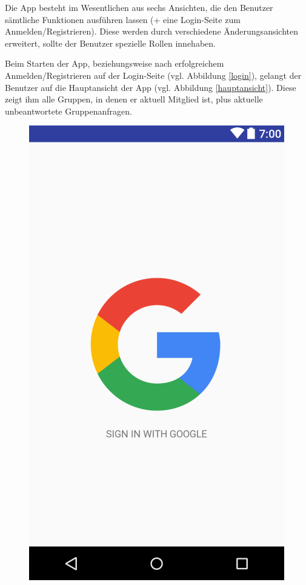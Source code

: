 \documentclass[parskip=full]{scrartcl}
\begin{document}
Die App besteht im Wesentlichen aus sechs Ansichten, die den Benutzer sämtliche Funktionen ausführen lassen (+ eine Login-Seite zum Anmelden/Registrieren). Diese werden durch verschiedene Änderungsansichten erweitert, sollte der Benutzer spezielle Rollen innehaben.

\newpage

Beim Starten der App, beziehungsweise nach erfolgreichem Anmelden/Registrieren auf der Login-Seite (vgl. Abbildung \ref{login}), gelangt der Benutzer auf die Hauptansicht der App (vgl. Abbildung \ref{hauptansicht}). Diese zeigt ihm alle Gruppen, in denen er aktuell Mitglied ist, plus aktuelle unbeantwortete Gruppenanfragen.

\begin{figure}[H]
  \vspace{1cm}
  \centering
  \begin{minipage}[b]{0.4\textwidth}
    \includegraphics[width=\textwidth]{GUI/AndroidStudio/login_simple.PNG}

\end{minipage}
\end{figure}
\end{document}
